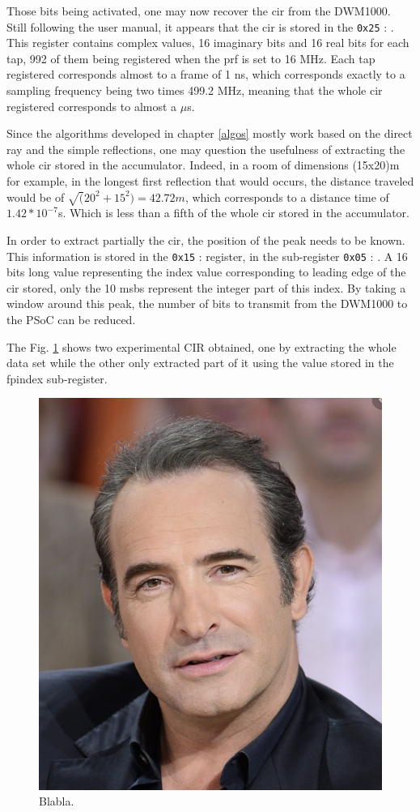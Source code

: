 Those bits being activated, one may now recover the \gls{cir} from the DWM1000. Still following the user manual, it appears that the \gls{cir} is stored in the \texttt{0x25} : . This register contains complex values, 16 imaginary bits and 16 real bits for each tap, 992 of them being registered when the \gls{prf} is set to 16 MHz. Each tap registered corresponds almost to a frame of 1 ns, which corresponds exactly to a sampling frequency  being two times 499.2 MHz, meaning that the whole \gls{cir} registered corresponds to almost a $\mu$s.
\vspace{2mm}

Since the algorithms developed in chapter \ref{algos} mostly work based on the direct ray and the simple reflections, one may question the usefulness of extracting the whole \gls{cir} stored in the accumulator. Indeed, in a room of dimensions (15x20)m for example, in the longest first reflection that would occurs, the distance traveled would be of $\sqrt(20^2 + 15^2) = 42.72m$, which corresponds to a distance time of $1.42*10^{-7}$s. Which is less than a fifth of the whole \gls{cir} stored in the accumulator.
\vspace{2mm}

In order to extract partially the \gls{cir}, the position of the peak needs to be known. This information is stored in the \texttt{0x15} :  register, in the sub-register \texttt{0x05} :  . A 16 bits long value representing the index value corresponding to leading edge of the \gls{cir} stored, only the 10 \glspl{msb} represent the integer part of this index. By taking a window around this peak, the number of bits to transmit from the DWM1000 to the PSoC can be reduced.
\vspace{2mm}

The Fig. \ref{fig:cir_long_short} shows two experimental \gls{CIR} obtained, one by extracting the whole data set while the other only extracted part of it using the value stored in the \gls{fpindex} sub-register.

\begin{figure}[H]
\centering
\includegraphics[width=.2\linewidth]{Images/Temporary_pic.png}
\caption{Blabla. \label{fig:cir_long_short}}
\end{figure}

